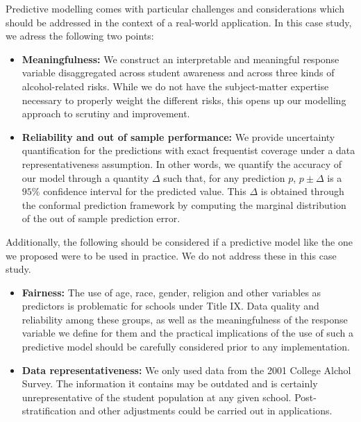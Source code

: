 \documentclass[10pt]{jmlr}%
\begin{document}
Predictive modelling comes with particular challenges and considerations which should be addressed in the context of a real-world application. In this case study, we adress the following two points:

\begin{itemize}
\item \textbf{Meaningfulness:} We construct an interpretable and meaningful response variable disaggregated across student awareness and across three kinds of alcohol-related risks. While we do not have the subject-matter expertise necessary to properly weight the different risks, this opens up our modelling approach to scrutiny and improvement.
\item \textbf{Reliability and out of sample performance:} We provide uncertainty quantification for the predictions with exact frequentist coverage under a data representativeness assumption. In other words, we quantify the accuracy of our model through a quantity $\Delta$ such that, for any prediction $p$, $p \pm \Delta$ is a $95\%$ confidence interval for the predicted value. This $\Delta$ is obtained through the conformal prediction framework by computing the marginal distribution of the out of sample prediction error. 
\end{itemize}


Additionally, the following should be considered if a predictive model like the one we proposed were to be used in practice. We do not address these in this case study.

\begin{itemize}
\item \textbf{Fairness:} The use of age, race, gender, religion and other variables as predictors is problematic for schools under Title IX. Data quality and reliability among these groups, as well as the meaningfulness of the response variable we define for them and the practical implications of the use of such a predictive model should be carefully considered prior to any implementation.
\item \textbf{Data representativeness:} We only used data from the 2001 College Alchol Survey. The information it contains may be outdated and is certainly unrepresentative of the student population at any given school. Post-stratification and other adjustments could be carried out in applications.
\end{itemize}
\end{document}
